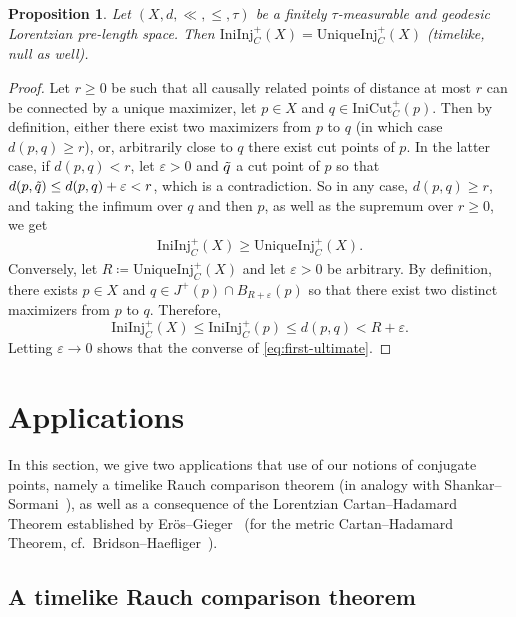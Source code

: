 \documentclass[a4paper,11pt]{article}
\numberwithin{equation}{section}
\theoremstyle{plain}
\newtheorem{Proposition}[Definition]{Proposition}
\theoremstyle{definition}
\newcommand{\eps}{\varepsilon}
\begin{document}
\begin{Proposition}
Let $(X,d,\ll,\leq,\tau)$ be a finitely $\tau$-measurable and geodesic Lorentzian pre-length space. Then $\mathrm{IniInj}_C^+(X) = \mathrm{UniqueInj}_C^+(X)$ (timelike, null as well).
\end{Proposition}
\begin{proof}
Let $r \geq 0$ be such that all causally related points of distance at most $r$ can be connected by a unique maximizer, let $p \in X$ and $q \in
\mathrm{IniCut}_C^+(p)$.
Then by definition, either there exist two maximizers from $p$ to $q$ (in which case $d(p,q) \geq r$), or, arbitrarily close to $q$ there exist cut points of $p$. In the latter case, if $d(p,q) < r$, let $\varepsilon > 0$ and $\Tilde{q}$ a cut point of $p$ so that $d(p,\Tilde{q}) \leq d(p,q) + \varepsilon < r$, which is a contradiction. So in any case, $d(p,q) \geq r$, and taking the infimum over $q$ and then $p$, as well as the supremum over $r \geq 0$, we get
\begin{align}\label{eq:first-ultimate}
    \mathrm{IniInj}_C^+(X)
    \geq \mathrm{UniqueInj}_C^+(X).
\end{align}
Conversely, let $R \coloneqq \mathrm{UniqueInj}_C^+(X)$ and let $\varepsilon > 0$ be arbitrary. By definition, there exists $p \in X$ and $q \in J^+(p) \cap B_{R+\varepsilon}(p)$ so that there exist two distinct maximizers from $p$ to $q$. Therefore,
\[ 
\mathrm{IniInj}_C^+(X)
\le 
\mathrm{IniInj}_C^+(p)
\le d(p,q) < R+\eps.
\]
Letting $\eps\to 0$ shows that the converse of \eqref{eq:first-ultimate}.
\end{proof}

\section{Applications}
\label{Section: applications}

In this section, we give two applications that use of our notions of conjugate points, namely a timelike Rauch comparison theorem (in analogy with Shankar--Sormani~\cite[Thm.\ 10.1]{shankar2009conjugate}), as well as a consequence of the Lorentzian Cartan--Hadamard Theorem established by Er\"{o}s--Gieger~\cite{Eroes-Gieger25} (for the metric Cartan--Hadamard Theorem, cf.\ Bridson--Haefliger~\cite[Thm.\ 4.1]{bridson2013metric}).

\subsection{A timelike Rauch comparison theorem}
\label{subsection: Timelike Rauch}
\end{document}
